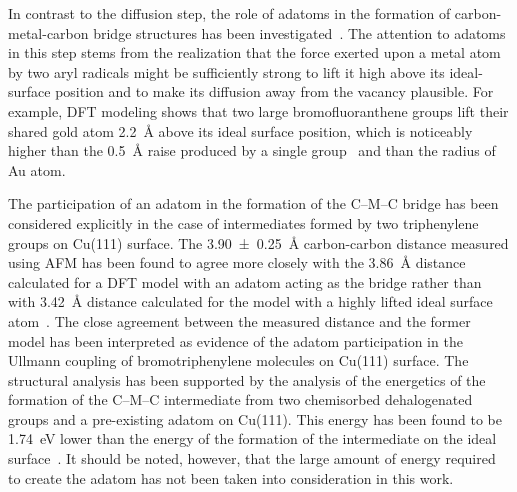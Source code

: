 \documentclass[%
 reprint,
 amsmath,amssymb,
 aps,
prb,
floatfix,
]{revtex4-2}
\newcommand{\lock}{\color{red}}
\newcommand{\lock}{\color{black}}
\newcommand{\comm}{\color{ForestGreen}} %
\begin{document}
{\lock

In contrast to the diffusion step, the role of adatoms in the formation of carbon-metal-carbon bridge structures has been investigated~\cite{acsnano2017, acsnano2019}. %
The attention to adatoms in this step stems from the realization that the force exerted upon a metal atom by two aryl radicals might be sufficiently strong to lift it high above its ideal-surface position and to make its diffusion away from the vacancy plausible. 
For example, DFT modeling shows that two large bromofluoranthene groups lift their shared gold atom \SI{2.2}{\angstrom} above its ideal surface position, which is noticeably higher than the \SI{0.5}{\angstrom} raise produced by a single group~\cite{jpcc2018} and than the radius of Au atom.

The participation of an adatom in the formation of the C--M--C bridge has been considered explicitly in the case of intermediates formed by two triphenylene groups on Cu(111) surface. 
The \SI{3.90\pm 0.25}{\angstrom} carbon-carbon distance measured using AFM has been found to agree more closely with the \SI{3.86}{\angstrom} distance calculated for a DFT model with an adatom acting as the bridge rather than with \SI{3.42}{\angstrom} distance calculated for the model with a highly lifted ideal surface atom~\cite{acsnano2017}. 
The close agreement between the measured distance and the former model has been interpreted as evidence of the adatom participation in the Ullmann coupling of bromotriphenylene molecules on Cu(111) surface. 
%
The structural analysis has been supported by the analysis of the energetics of the formation of the C--M--C intermediate from two chemisorbed dehalogenated groups and a pre-existing adatom on Cu(111). This energy has been found to be \SI{1.74}{\electronvolt} lower than the energy of the formation of the intermediate on the ideal surface~\cite{acsnano2017}. It should be noted, however, that the large amount of energy required to create the adatom has not been taken into consideration in this work.

}
\end{document}
